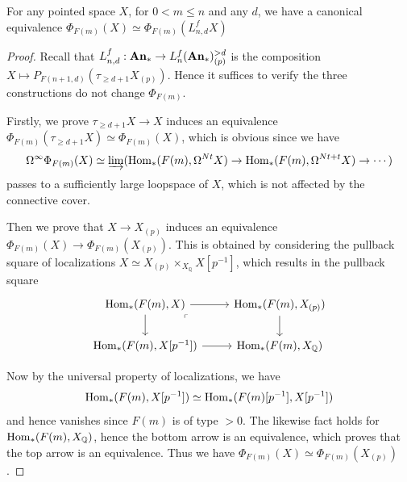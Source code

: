	\begin{thm}\label{Pre_Bousfield_Kuhn_inv_tel_loc}
		For any pointed space $X$, for $0<m\leq n$ and any $d$, we have a canonical equivalence $\Phi_{F(m)}(X)\simeq\Phi_{F(m)}(L_{n,d}^fX)$
	\end{thm}
	\begin{proof}
		Recall that $L_{n,d}^f:\mathbf{An}_*\to L_n^f(\mathbf{An}_*)_{(p)}^{>d}$ is the composition $X\mapsto P_{F(n+1,d)}(\tau_{\geq d+1}X_{(p)})$. Hence it suffices to verify the three constructions do not change $\Phi_{F(m)}$. 

		Firstly, we prove $\tau_{\geq d+1}X\to X$ induces an equivalence $\Phi_{F(m)}(\tau_{\geq d+1}X)\simeq\Phi_{F(m)}(X)$, which is obvious since we have 
		\[ \Omega^\infty\Phi_{F(m)}(X)\simeq\varinjlim(\operatorname{\mathrm{Hom}}_*(F(m),\Omega^{Nt}X)\to\operatorname{\mathrm{Hom}}_*(F(m),\Omega^{Nt+t}X)\to\cdots) \]
		passes to a sufficiently large loopspace of $X$, which is not affected by the connective cover. 

		Then we prove that $X\to X_{(p)}$ induces an equivalence $\Phi_{F(m)}(X)\to\Phi_{F(m)}(X_{(p)})$. This is obtained by considering the pullback square of localizations $X\simeq X_{(p)}\times_{X_\mathbb{Q}}X[p^{-1}]$, which results in the pullback square
		\[\begin{tikzcd}[ampersand replacement=\&]
			{\Hom_*(F(m),X)} \& {\Hom_*(F(m),X_{(p)})} \\
			{\Hom_*(F(m),X[p^{-1}])} \& {\Hom_*(F(m),X_\mathbb{Q})}
			\arrow[from=1-1, to=1-2]
			\arrow[from=1-1, to=2-1]
			\arrow["\ulcorner"{anchor=center, pos=0.125}, draw=none, from=1-1, to=2-2]
			\arrow[from=1-2, to=2-2]
			\arrow[from=2-1, to=2-2]
		\end{tikzcd}\]

		Now by the universal property of localizations, we have 
		\[ \operatorname{\mathrm{Hom}}_*(F(m),X[p^{-1}])\simeq\operatorname{\mathrm{Hom}}_*(F(m)[p^{-1}],X[p^{-1}]) \] 
		and hence vanishes since $F(m)$ is of type $>0$. The likewise fact holds for $\operatorname{\mathrm{Hom}}_*(F(m),X_\mathbb{Q})$, hence the bottom arrow is an equivalence, which proves that the top arrow is an equivalence. Thus we have $\Phi_{F(m)}(X)\simeq\Phi_{F(m)}(X_{(p)})$. 


\end{proof}
